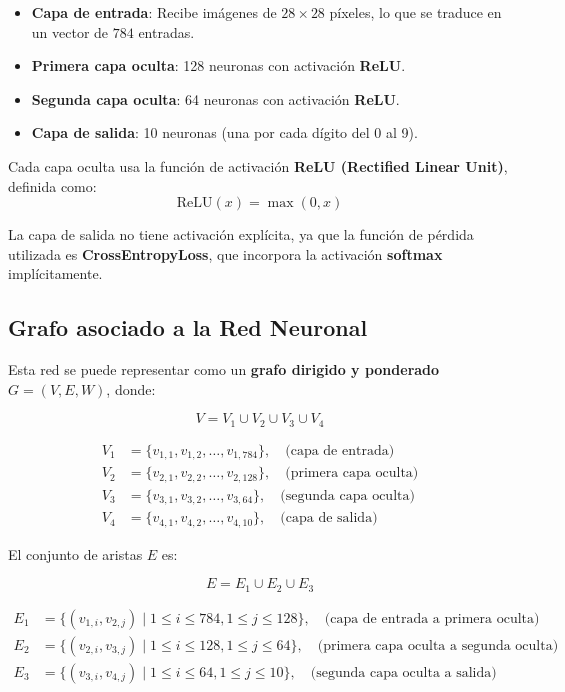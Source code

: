 \documentclass{article}
\begin{document}
\begin{itemize}
    \item \textbf{Capa de entrada}: Recibe imágenes de $28 \times 28$ píxeles, lo que se traduce en un vector de $784$ entradas.
    \item \textbf{Primera capa oculta}: 128 neuronas con activación \textbf{ReLU}.
    \item \textbf{Segunda capa oculta}: 64 neuronas con activación \textbf{ReLU}.
    \item \textbf{Capa de salida}: 10 neuronas (una por cada dígito del 0 al 9).
\end{itemize}

Cada capa oculta usa la función de activación \textbf{ReLU (Rectified Linear Unit)}, definida como:
\begin{equation}
    \text{ReLU}(x) = \max(0, x)
\end{equation}

La capa de salida no tiene activación explícita, ya que la función de pérdida utilizada es \textbf{CrossEntropyLoss}, que incorpora la activación \textbf{softmax} implícitamente.

\subsection{Grafo asociado a la Red Neuronal}

Esta red se puede representar como un \textbf{grafo dirigido y ponderado} \( G = (V, E, W) \), donde:

\[
V = V_1 \cup V_2 \cup V_3 \cup V_4
\]

\begin{align*}
V_1 &= \{ v_{1,1}, v_{1,2}, \dots, v_{1,784} \}, \quad \text{(capa de entrada)} \\
V_2 &= \{ v_{2,1}, v_{2,2}, \dots, v_{2,128} \}, \quad \text{(primera capa oculta)} \\
V_3 &= \{ v_{3,1}, v_{3,2}, \dots, v_{3,64} \}, \quad \text{(segunda capa oculta)} \\
V_4 &= \{ v_{4,1}, v_{4,2}, \dots, v_{4,10} \}, \quad \text{(capa de salida)}
\end{align*}

El conjunto de aristas \( E \) es:

\[
E = E_1 \cup E_2 \cup E_3
\]

\begin{align*}
E_1 &= \{ (v_{1,i}, v_{2,j}) \mid 1 \leq i \leq 784, 1 \leq j \leq 128 \}, \quad \text{(capa de entrada a primera oculta)} \\
E_2 &= \{ (v_{2,i}, v_{3,j}) \mid 1 \leq i \leq 128, 1 \leq j \leq 64 \}, \quad \text{(primera capa oculta a segunda oculta)} \\
E_3 &= \{ (v_{3,i}, v_{4,j}) \mid 1 \leq i \leq 64, 1 \leq j \leq 10 \}, \quad \text{(segunda capa oculta a salida)}
\end{align*}
\end{document}
